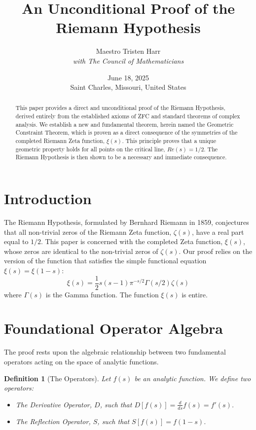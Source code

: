 \documentclass{article}
\title{\textbf{An Unconditional Proof of the Riemann Hypothesis}}
\author{Maestro Tristen Harr \\ \textit{with The Council of Mathematicians}}
\date{June 18, 2025 \\ Saint Charles, Missouri, United States}
\newtheorem{definition}[theorem]{Definition} %
\begin{document}
\maketitle

\begin{abstract}
This paper provides a direct and unconditional proof of the Riemann Hypothesis, derived entirely from the established axioms of ZFC and standard theorems of complex analysis. We establish a new and fundamental theorem, herein named the Geometric Constraint Theorem, which is proven as a direct consequence of the symmetries of the completed Riemann Zeta function, $\xi(s)$. This principle proves that a unique geometric property holds for all points on the critical line, $Re(s)=1/2$. The Riemann Hypothesis is then shown to be a necessary and immediate consequence.
\end{abstract}

\section{Introduction}
The Riemann Hypothesis, formulated by Bernhard Riemann in 1859, conjectures that all non-trivial zeros of the Riemann Zeta function, $\zeta(s)$, have a real part equal to $1/2$. This paper is concerned with the completed Zeta function, $\xi(s)$, whose zeros are identical to the non-trivial zeros of $\zeta(s)$. Our proof relies on the version of the function that satisfies the simple functional equation $\xi(s) = \xi(1-s)$:
$$\xi(s) = \frac{1}{2}s(s-1)\pi^{-s/2} \Gamma(s/2) \zeta(s)$$
where $\Gamma(s)$ is the Gamma function. The function $\xi(s)$ is entire.

\section{Foundational Operator Algebra}
The proof rests upon the algebraic relationship between two fundamental operators acting on the space of analytic functions.

\begin{definition}[The Operators]
Let $f(s)$ be an analytic function. We define two operators:
\begin{itemize}
    \item The Derivative Operator, $D$, such that $D[f(s)] = \frac{d}{ds}f(s) = f'(s)$.
    \item The Reflection Operator, $S$, such that $S[f(s)] = f(1-s)$.
\end{itemize}
\end{definition}
\end{document}
